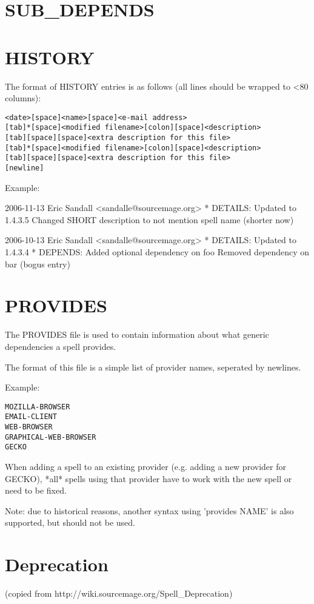 \documentclass[a4paper,10pt]{book}
\begin{document}
\section{SUB\_DEPENDS}
\section{HISTORY}
The format of HISTORY entries is as follows (all lines should be wrapped
to <80 columns):
\begin{verbatim}
<date>[space]<name>[space]<e-mail address>
[tab]*[space]<modified filename>[colon][space]<description>
[tab][space][space]<extra description for this file>
[tab]*[space]<modified filename>[colon][space]<description>
[tab][space][space]<extra description for this file>
[newline]
\end{verbatim}

Example:
\begin{verbatim*}
2006-11-13 Eric Sandall <sandalle@sourcemage.org>
	* DETAILS: Updated to 1.4.3.5
	  Changed SHORT description to not mention spell name (shorter now)

2006-10-13 Eric Sandall <sandalle@sourcemage.org>
	* DETAILS: Updated to 1.4.3.4
	* DEPENDS: Added optional dependency on foo
	  Removed dependency on bar (bogus entry)
\end{verbatim*}

\section{PROVIDES}
The PROVIDES file is used to contain information about what generic
dependencies a spell provides.

The format of this file is a simple list of provider names, seperated by
newlines.

Example:
\begin{verbatim}
MOZILLA-BROWSER
EMAIL-CLIENT
WEB-BROWSER
GRAPHICAL-WEB-BROWSER
GECKO
\end{verbatim}

When adding a spell to an existing provider (e.g. adding a new provider for
GECKO), *all* spells using that provider have to work with the new spell or
need
to be fixed.

Note: due to historical reasons, another syntax using 'provides \textdollar
NAME' is also
supported, but should not be used.

\section{Deprecation}
(copied from http://wiki.sourcemage.org/Spell\_Deprecation)
\end{document}
